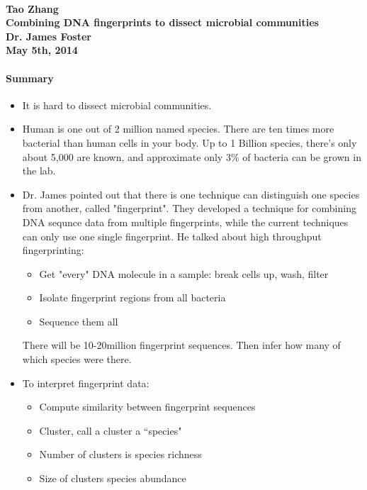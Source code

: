 \documentclass[12pt]{article}
\begin{document}
\paragraph{Tao Zhang\\Combining DNA fingerprints to dissect microbial communities\\Dr. James Foster\\May 5th, 2014}

\paragraph{Summary}

\begin{itemize}
\item It is hard to dissect microbial communities. 

\item Human is one out of 2 million named species. There are ten times more bacterial than human cells in your body. Up to 1 Billion species, there's only about 5,000 are known, and approximate only 3\% of bacteria can be grown in the lab.

\item Dr. James pointed out that there is one technique can distinguish one species from another, called "fingerprint". They developed a technique for combining DNA sequnce data from multiple fingerprints, while the current techniques can only use one single fingerprint. He talked about high throughput fingerprinting:
	\begin{itemize}
	\item Get "every" DNA molecule in a sample: break cells up, wash, filter
	\item Isolate fingerprint regions from all bacteria
	\item Sequence them all
	\end{itemize}
There will be 10-20million fingerprint sequences. Then infer how many of which species were there. 

\item To interpret fingerprint data:
\begin{itemize}
\item Compute similarity between fingerprint sequences
\item Cluster, call a cluster a ``species"
\item Number of clusters is species richness
\item Size of clusters species abundance
\end{itemize}


\end{itemize}
\end{document}
